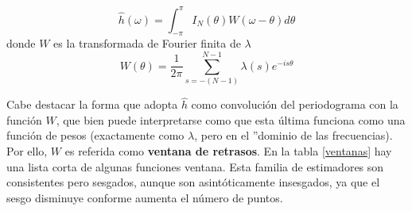 \documentclass[12pt,a4paper]{mitthesis}
\newcommand{\intPI}{\int_{-\pi}^{\pi}}
\newcommand{\est}[1]{\widehat{ #1 }}
\begin{document}
\begin{equation*}
\est{h}(\omega) = \intPI I_N(\theta) W(\omega-\theta) d\theta
\end{equation*}
donde $W$ es la transformada de Fourier finita de $\lambda$
\begin{equation*}
W(\theta) = \frac{1}{2\pi} \sum_{s = -(N-1)}^{N-1} \lambda(s) e^{-is\theta}
\end{equation*}

Cabe destacar la forma que adopta $\est{h}$ como convoluci\'on del periodograma con la funci\'on
$W$, que bien puede interpretarse como que esta \'ultima funciona como una funci\'on de pesos
(exactamente como $\lambda$, pero en el ''dominio de las frecuencias). Por ello, $W$ es referida 
como \textbf{ventana de retrasos}.
En la tabla \ref{ventanas} hay una lista corta de algunas funciones ventana.
Esta familia de estimadores son consistentes pero sesgados, aunque son asint\'oticamente 
insesgados, ya que el sesgo disminuye conforme aumenta el n\'umero de puntos.
\end{document}
